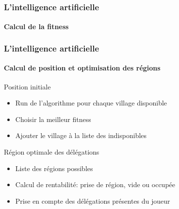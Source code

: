 \begin{frame}
	\frametitle{L'intelligence artificielle}
	\framesubtitle{Calcul de la fitness}
	
\end{frame}

\begin{frame}
	\frametitle{L'intelligence artificielle}
	\framesubtitle{Calcul de position et optimisation des régions}
	
	\begin{block}{Position initiale}
		\begin{itemize}
			\item Run de l'algorithme pour chaque village disponible
			\item Choisir la meilleur fitness
			\item Ajouter le village à la liste des indisponibles
		\end{itemize}
	\end{block}	
	
	\begin{exampleblock}{Région optimale des délégations}
		\begin{itemize}
			\item Liste des régions possibles
			\item Calcul de rentabilité: prise de région, vide ou occupée
			\item Prise en compte des délégations présentes du joueur
		\end{itemize}
	\end{exampleblock}	
\end{frame}
